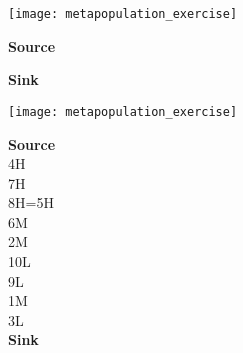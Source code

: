 \documentclass[t]{beamer}
\begin{document}
{
	\begin{frame}[b]{}
	\end{frame}
}
%
\begin{frame}[c]{}
	\begin{minipage}{0.8\textwidth}
		\begin{center}
			\vspace{1\baselineskip}
			\texttt{[image: metapopulation\_exercise]}
		\end{center}
	\end{minipage}\begin{minipage}{0.19\textwidth}
		\flushleft
		
		\textbf{Source}\\
		
		\vspace*{9\baselineskip}
		
		\vspace*{2ex}
		
		\textbf{Sink} 
		
	\end{minipage}	
\end{frame}
%
\begin{frame}[c]{}
	\begin{minipage}{0.8\textwidth}
		\begin{center}
			\vspace{1\baselineskip}
			\texttt{[image: metapopulation\_exercise]}
		\end{center}
	\end{minipage}\begin{minipage}{0.19\textwidth}
		\flushleft
		
		\textbf{Source}\\
		4H\\
		7H\\
		
		\vspace{1ex}
		8H=5H\\
		6M\\
		2M\\
		10L\\
		
		\vspace{1ex}
		9L\\
		1M\\
		3L\\
		\textbf{Sink} 
		
	\end{minipage}	
\end{frame}
%
\end{document}
